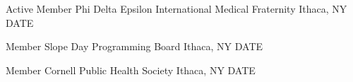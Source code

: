 \begin{cventries}
  \cventry
    {Active Member} %
    {Phi Delta Epsilon International Medical Fraternity} %
    {Ithaca, NY} %
    {DATE} %
    {
      \begin{cvitems} %
        \item {} 
      \end{cvitems}
    }

  \cventry
    {Member} %
    {Slope Day Programming Board} %
    {Ithaca, NY} %
    {DATE} %
    {
      \begin{cvitems} %
        \item {}
      \end{cvitems}
    }

  \cventry
    {Member} %
    {Cornell Public Health Society} %
    {Ithaca, NY} %
    {DATE} %
    {
      \begin{cvitems} %
        \item {}
      \end{cvitems}
    }

\end{cventries}
